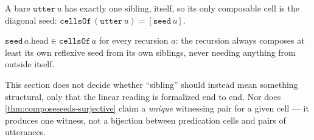 \begin{proposition}\label{thm:cellsof-utter}\leanok{}
A bare \(\texttt{utter}\,u\) has exactly one sibling, itself, so its only
composable cell is the diagonal seed: \(\texttt{cellsOf}\,(\texttt{utter}\,u)
= [\texttt{seed}\,u]\).
\end{proposition}

\begin{theorem}\label{thm:seed-head-mem-cellsof}\leanok{}
\(\texttt{seed}\,a.\mathrm{head} \in \texttt{cellsOf}\,a\) for every
recursion \(a\): the recursion always composes at least its own reflexive
seed from its own siblings, never needing anything from outside itself.
\end{theorem}

This section does not decide whether ``sibling'' should instead mean
something structural, only that the linear reading is formalized end to end.
Nor does \cref{thm:composeseeds-surjective} claim a \emph{unique} witnessing
pair for a given cell --- it produces one witness, not a bijection between
predication cells and pairs of utterances.

